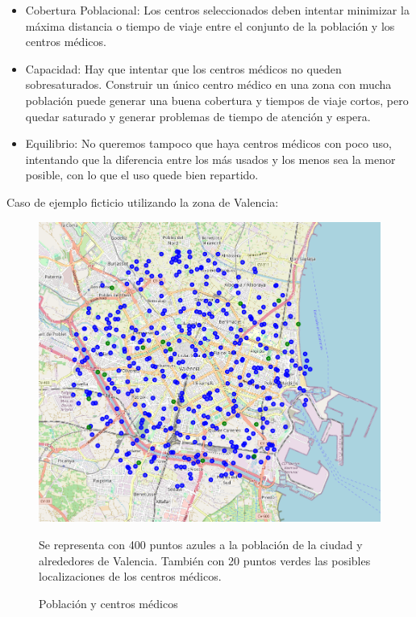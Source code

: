 \documentclass[12pt,a4paper]{book}
\begin{document}
\begin{itemize}
    \item Cobertura Poblacional: Los centros seleccionados deben intentar minimizar la máxima distancia o tiempo de viaje entre el conjunto de la población y los centros médicos.
    \item Capacidad: Hay que intentar que los centros médicos no queden sobresaturados. Construir un único centro médico en una zona con mucha población puede generar una buena cobertura y tiempos de viaje cortos, pero quedar saturado y generar problemas de tiempo de atención y espera.
    \item Equilibrio: No queremos tampoco que haya centros médicos con poco uso, intentando que la diferencia entre los más usados y los menos sea la menor posible, con lo que el uso quede bien repartido.
\end{itemize}
Caso de ejemplo ficticio utilizando la zona de Valencia:
\begin{figure}[H]
    \centering
    \begin{minipage}[c]{0.45\textwidth}
        \includegraphics[width=\textwidth]{images/ejemplo_centros_medicos.png}
        \label{fig:poblacion_centros_medicos}
    \end{minipage}
    \hfill
    \begin{minipage}[c]{0.45\textwidth}

        Se representa con 400 puntos azules a la población de la ciudad y alrededores de Valencia. También con 20 puntos verdes las posibles localizaciones de los centros médicos.
    \end{minipage}
    \caption{Población y centros médicos}
\end{figure}
\end{document}
